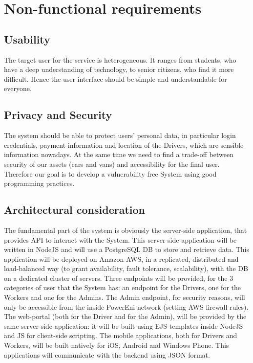 \section{Non-functional requirements}

\subsection{Usability}
The target user for the service is heterogeneous. It ranges from students, who have a deep understanding of technology, to senior citizens, who find it more difficult. Hence the user interface should be simple and understandable for everyone. \\

\subsection{Privacy and Security}
The system should be able to protect users' personal data, in particular login credentials, payment information and location of the Drivers, which are sensible information nowadays. At the same time we need to find a trade-off between security of our assets (cars and vans) and accessibility for the final user. Therefore our goal is to develop a vulnerability free System using good programming practices. \\

\subsection{Architectural consideration}
The fundamental part of the system is obviously the server-side application, that provides API to interact with the System. 
This server-side application will be written in NodeJS and will use a PostgreSQL DB to store and retrieve data. This application will be deployed on Amazon AWS, in a replicated, distributed and load-balanced way (to grant availability, fault tolerance, scalability), with the DB on a dedicated cluster of servers. 
Three endpoints will be provided, for the 3 categories of user that the System has: an endpoint for the Drivers, one for the Workers and one for the Admins. The Admin endpoint, for security reasons, will only be accessible from the inside PowerEni network (setting AWS firewall rules). 
The web-portal (both for the Driver and for the Admin), will be provided by the same server-side application: it will be built using EJS templates inside NodeJS and JS for client-side scripting. 
The mobile applications, both for Drivers and Workers, will be built natively for iOS, Android and Windows Phone. This applications will communicate with the backend using JSON format.\\

